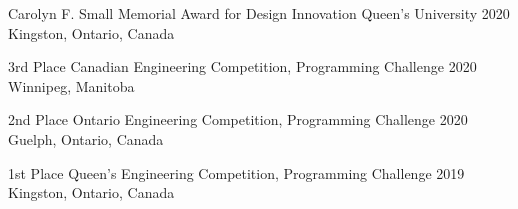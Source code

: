 



\begin{cvhonors}


  \cvhonor
    {Carolyn F. Small Memorial Award for Design Innovation} %
    {Queen's University} %
    {2020} %
    {Kingston, Ontario, Canada} %

  \cvhonor
    {3rd Place} %
    {Canadian Engineering Competition, Programming Challenge} %
    {2020} %
    {Winnipeg, Manitoba} %

  \cvhonor
    {2nd Place} %
    {Ontario Engineering Competition, Programming Challenge} %
    {2020} %
    {Guelph, Ontario, Canada} %

  \cvhonor
    {1st Place} %
    {Queen's Engineering Competition, Programming Challenge} %
    {2019} %
    {Kingston, Ontario, Canada} %
    
\end{cvhonors}